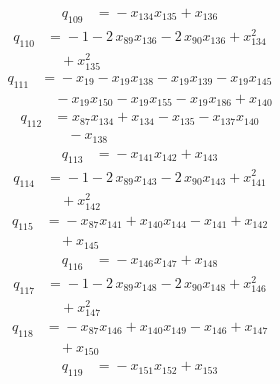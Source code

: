 \begin{align*}
q_{109} &={}-x_{134}x_{135} +x_{136}
\end{align*}
\begin{align*}
q_{110} &={}-1 -2\,x_{89}x_{136} -2\,x_{90}x_{136} +x_{134}^{2}\\
&\quad +x_{135}^{2}
\end{align*}
\begin{align*}
q_{111} &={}-x_{19} -x_{19}x_{138} -x_{19}x_{139} -x_{19}x_{145}\\
&\quad -x_{19}x_{150} -x_{19}x_{155} -x_{19}x_{186} +x_{140}
\end{align*}
\begin{align*}
q_{112} &={}x_{87}x_{134} +x_{134} -x_{135} -x_{137}x_{140}\\
&\quad -x_{138}
\end{align*}
\begin{align*}
q_{113} &={}-x_{141}x_{142} +x_{143}
\end{align*}
\begin{align*}
q_{114} &={}-1 -2\,x_{89}x_{143} -2\,x_{90}x_{143} +x_{141}^{2}\\
&\quad +x_{142}^{2}
\end{align*}
\begin{align*}
q_{115} &={}-x_{87}x_{141} +x_{140}x_{144} -x_{141} +x_{142}\\
&\quad +x_{145}
\end{align*}
\begin{align*}
q_{116} &={}-x_{146}x_{147} +x_{148}
\end{align*}
\begin{align*}
q_{117} &={}-1 -2\,x_{89}x_{148} -2\,x_{90}x_{148} +x_{146}^{2}\\
&\quad +x_{147}^{2}
\end{align*}
\begin{align*}
q_{118} &={}-x_{87}x_{146} +x_{140}x_{149} -x_{146} +x_{147}\\
&\quad +x_{150}
\end{align*}
\begin{align*}
q_{119} &={}-x_{151}x_{152} +x_{153}
\end{align*}
